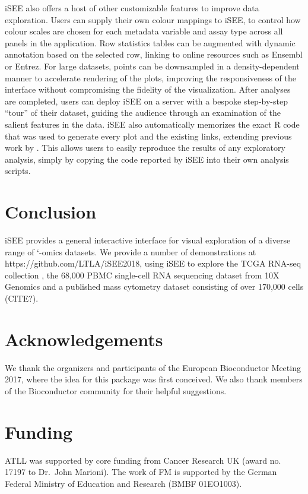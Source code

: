 \documentclass{bioinfo}
\begin{document}
iSEE also offers a host of other customizable features to improve data exploration.
Users can supply their own colour mappings to iSEE, to control how colour scales are chosen for each metadata variable and assay type across all panels in the application.
Row statistics tables can be augmented with dynamic annotation based on the selected row, linking to online resources such as Ensembl or Entrez. %
For large datasets, points can be downsampled in a density-dependent manner to accelerate rendering of the plots, improving the responsiveness of the interface without compromising the fidelity of the visualization.
After analyses are completed, users can deploy iSEE on a server with a bespoke step-by-step ``tour'' of their dataset, guiding the audience through an examination of the salient features in the data.
iSEE also automatically memorizes the exact R code that was used to generate every plot and the existing links,
extending previous work by \cite{marini2016interrepro}.
This allows users to easily reproduce the results of any exploratory analysis, simply by copying the code reported by iSEE into their own analysis scripts.

\section{Conclusion}
iSEE provides a general interactive interface for visual exploration of a diverse range of `-omics datasets.
We provide a number of demonstrations at https://github.com/LTLA/iSEE2018, using iSEE to explore the TCGA RNA-seq collection \citep{piccolo2015TCGA}, the 68,000 PBMC single-cell RNA sequencing dataset from 10X Genomics \citep{zheng2017massively} and a published mass cytometry dataset consisting of over 170,000 cells (CITE?).

\section*{Acknowledgements}
We thank the organizers and participants of the European Bioconductor Meeting 2017, where the idea for this package was first conceived.
We also thank members of the Bioconductor community for their helpful suggestions.
\vspace*{-12pt}

\section*{Funding}
ATLL was supported by core funding from Cancer Research UK (award no. 17197 to Dr.\ John Marioni).
The work of FM is supported by the German Federal Ministry of Education and Research (BMBF 01EO1003).
\vspace*{-12pt}

%
%

%
%
%
%
%

\end{document}
